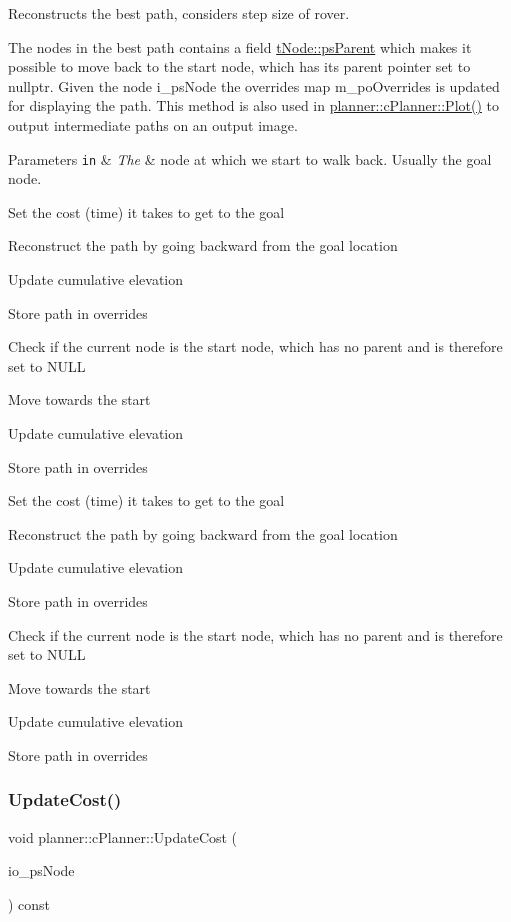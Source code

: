 Reconstructs the best path, considers step size of rover. 

The nodes in the best path contains a field \mbox{\hyperlink{structplanner_1_1t_node_a626d33dc40af6be79e975d54200d77e8}{t\+Node\+::ps\+Parent}} which makes it possible to move back to the start node, which has its parent pointer set to nullptr. Given the node i\+\_\+ps\+Node the overrides map m\+\_\+po\+Overrides is updated for displaying the path. This method is also used in \mbox{\hyperlink{classplanner_1_1c_planner_a236a68e02c7a99323f2d30b3097aa767}{planner\+::c\+Planner\+::\+Plot()}} to output intermediate paths on an output image. 
\begin{DoxyParams}[1]{Parameters}
\mbox{\tt in}  & {\em The} & node at which we start to walk back. Usually the goal node. \\
\hline
\end{DoxyParams}
Set the cost (time) it takes to get to the goal

Reconstruct the path by going backward from the goal location

Update cumulative elevation

Store path in overrides

Check if the current node is the start node, which has no parent and is therefore set to N\+U\+LL

Move towards the start

Update cumulative elevation

Store path in overrides

Set the cost (time) it takes to get to the goal

Reconstruct the path by going backward from the goal location

Update cumulative elevation

Store path in overrides

Check if the current node is the start node, which has no parent and is therefore set to N\+U\+LL

Move towards the start

Update cumulative elevation

Store path in overrides \mbox{\label{classplanner_1_1c_planner_a16e8c156297fff49a6ba9b97073baffb}} 
\subsubsection{\texorpdfstring{Update\+Cost()}{UpdateCost()}\hspace{0.1cm}{\footnotesize\ttfamily [1/2]}}
{\footnotesize\ttfamily void planner\+::c\+Planner\+::\+Update\+Cost (\begin{DoxyParamCaption}\item[{std\+::shared\+\_\+ptr$<$ \mbox{\hyperlink{structplanner_1_1t_node}{t\+Node}} $>$}]{io\+\_\+ps\+Node }\end{DoxyParamCaption}) const}



